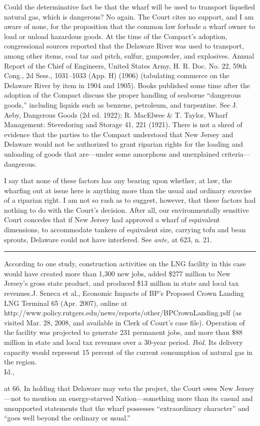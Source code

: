 {{  Could the determinative fact be that the wharf will be used to
transport liquefied natural gas, which is dangerous? No again. The Court
cites no support, and I am aware of none, for the proposition that the
common law forbade a wharf owner to load or unload hazardous goods. At
the time of the Compact's adoption, congressional sources reported
that the Delaware River was used to transport, among other items, coal
tar and pitch, sulfur, gunpowder, and explosives. Annual Report of the
Chief of Engineers, United States Army, H. R. Doc. No. 22, 59th Cong.,
2d Sess., 1031--1033 \newpage  (App. H) (1906) (tabulating commerce on
the Delaware River by item in 1904 and 1905). Books published some
time after the adoption of the Compact discuss the proper handling of
seaborne ``dangerous goods,'' including liquids such as benzene,
petroleum, and turpentine. See J. Aeby, Dangerous Goods (2d ed. 1922);
R. MacElwee \& T. Taylor, Wharf Management: Stevedoring and Storage 41,
221 (1921). There is not a shred of evidence that the parties to the
Compact understood that New Jersey and Delaware would not be authorized
to grant riparian rights for the loading and unloading of goods that
are---under some amorphous and unexplained criteria---dangerous.

  I say that none of these factors has any bearing upon whether, at
law, the wharfing out at issue here is anything more than the usual and
ordinary exercise of a riparian right. I am not so rash as to suggest,
however, that these factors had nothing to do with the Court's
decision. After all, our environmentally sensitive Court concedes
that if New Jersey had approved a wharf of equivalent dimensions, to
accommodate tankers of equivalent size, carrying tofu and bean sprouts,
Delaware could not have interfered. See \emph{ante,} at 623, n. 21.

\hrule

  According to one study, construction activities on the LNG facility
in this case would have created more than 1,300 new jobs, added \$277
million to New Jersey's gross state product, and produced \$13 million
in state and local tax revenues.J. Seneca et al., Economic Impacts of
BP's Proposed Crown Landing LNG Terminal 65 (Apr. 2007), online at
http://www.policy.rutgers.edu/news/reports/other/BPCrownLanding.pdf (as
visited Mar. 28, 2008, and available in Clerk of Court's case file).
Operation of the facility was projected to generate 231 permanent jobs,
and more than \$88 million in state and local tax revenues over a 30-year
period. \emph{Ibid.} Its delivery capacity would represent 15 percent
of the current consumption of natural gas in the region.\\Id.,} at
66. In \newpage  holding that Delaware may veto the project, the Court
owes New Jersey---not to mention an energy-starved Nation---something
more than its casual and unsupported statements that the wharf possesses
``extraordinary character'' and ``goes well beyond the ordinary or
usual.''

}

